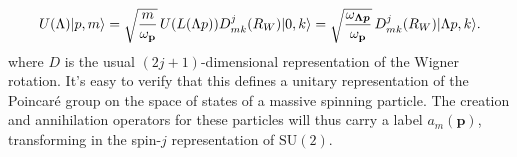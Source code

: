 \begin{equation}
  U(\Lambda)\lvert p,m\rangle
  =\sqrt{\frac{m}{\omega_{\mathbf p}}}\,U(L(\Lambda p))D^j_{mk}(R_W)\lvert 0,k\rangle
  =\sqrt{\frac{\omega_{\boldsymbol{\Lambda p}}}{\omega_{\mathbf p}}}\,
  D^j_{mk}(R_W)\lvert \Lambda p,k\rangle.
  \label{eq:4.1}
\end{equation}
where $D$ is the usual $(2j+1)$-dimensional representation of the Wigner rotation. It’s
easy to verify that this defines a unitary representation of the Poincaré group on the
space of states of a massive spinning particle. The creation and annihilation operators
for these particles will thus carry a label $a_m(\mathbf p)$, transforming in the spin-$j$ representation
of $\mathrm{SU}(2)$.
